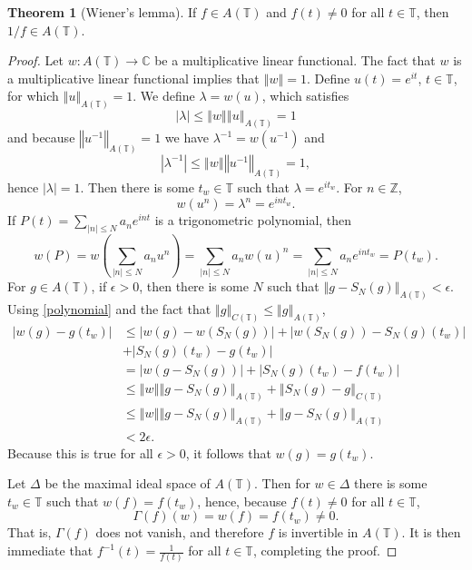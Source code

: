 \documentclass{article}
\newcommand{\norm}[1]{\left\Vert #1 \right\Vert}
\theoremstyle{definition}
\newtheorem{theorem}{Theorem}
\theoremstyle{definition}
\begin{document}
\begin{theorem}[Wiener's lemma]
If $f \in A(\mathbb{T})$ and $f(t) \neq 0$ for all $t \in \mathbb{T}$, then $1/f \in A(\mathbb{T})$.
\label{wienerlemma}
\end{theorem}
\begin{proof}
Let $w:A(\mathbb{T}) \to \mathbb{C}$ be a multiplicative linear functional. The fact that
$w$ is a multiplicative linear functional implies that $\norm{w} = 1$.  
Define $u(t)=e^{it}$,
$t \in \mathbb{T}$, for which $\norm{u}_{A(\mathbb{T})}=1$. 
We  define $\lambda = w(u)$, which satisfies
\[
|\lambda| \leq \norm{w} \norm{u}_{A(\mathbb{T})} = 1
\]
and because $\norm{u^{-1}}_{A(\mathbb{T})}=1$ we have $\lambda^{-1}=w(u^{-1})$ and 
\[
|\lambda^{-1}| \leq \norm{w} \norm{u^{-1}}_{A(\mathbb{T})} = 1,
\]
hence $|\lambda|=1$. Then there is some $t_w \in \mathbb{T}$ such that
$\lambda=e^{it_w}$.
For $n \in \mathbb{Z}$,
\[
w(u^n) = \lambda^n = e^{int_w}.
\]
If $P(t)=\sum_{|n| \leq N} a_n e^{int}$ is a trigonometric polynomial, then
\begin{equation}
w(P) = w\left( \sum_{|n| \leq N} a_n u^n\right) = \sum_{|n| \leq N} a_n w(u)^n = 
\sum_{|n| \leq N} a_n e^{int_w}=P(t_w).
\label{polynomial}
\end{equation}
For $g \in A(\mathbb{T})$,
if $\epsilon>0$, then there is some $N$ such that $\norm{g-S_N(g)}_{A(\mathbb{T})}<\epsilon$. Using \eqref{polynomial} and the fact
that $\norm{g}_{C(\mathbb{T})} \leq \norm{g}_{A(\mathbb{T})}$,
\begin{align*}
|w(g)-g(t_w)| &\leq |w(g)-w(S_N(g))|+|w(S_N(g))-S_N(g)(t_w)|\\
&+|S_N(g)(t_w)-g(t_w)|\\
&=|w(g-S_N(g))|+|S_N(g)(t_w)-f(t_w)|\\
&\leq \norm{w} \norm{g-S_N(g)}_{A(\mathbb{T})} + \norm{S_N(g)-g}_{C(\mathbb{T})}\\
&\leq \norm{w} \norm{g-S_N(g)}_{A(\mathbb{T})} +\norm{g-S_N(g)}_{A(\mathbb{T})}\\
&<2\epsilon.
\end{align*}
Because this is true for all $\epsilon>0$, it follows that $w(g)=g(t_w)$. 


Let $\Delta$ be the maximal ideal space of $A(\mathbb{T})$.
Then for $w \in \Delta$ there is some $t_w \in \mathbb{T}$ such that $w(f)=f(t_w)$, hence, because $f(t) \neq 0$ for all
$t \in \mathbb{T}$,
\[
\Gamma(f)(w)=w(f)=f(t_w) \neq 0.
\]
That is, $\Gamma(f)$ does not vanish, and therefore $f$ is invertible in $A(\mathbb{T})$. It is then immediate that
$f^{-1}(t)=\frac{1}{f(t)}$ for all $t \in \mathbb{T}$, completing the proof.
\end{proof}
\end{document}
